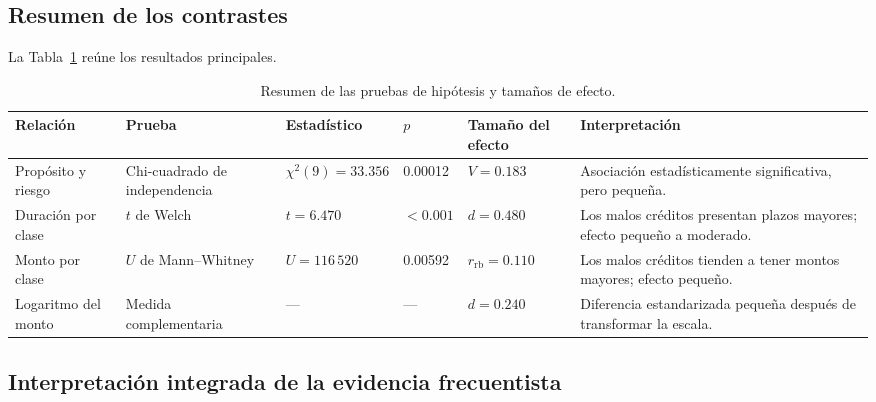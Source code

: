 \subsection{Resumen de los contrastes}

La Tabla~\ref{tab:resumen-inferencia} reúne los resultados principales.

\begin{table}[H]
    \centering
    \caption{Resumen de las pruebas de hipótesis y tamaños de efecto.}
    \label{tab:resumen-inferencia}

    \footnotesize
    \begin{tabularx}{\textwidth}{
        @{}
        >{\raggedright\arraybackslash}p{2.5cm}
        >{\raggedright\arraybackslash}p{2.7cm}
        >{\centering\arraybackslash}p{2.3cm}
        >{\centering\arraybackslash}p{1.5cm}
        >{\raggedright\arraybackslash}p{2.7cm}
        X
        @{}
    }
        \toprule
        Relación
        & Prueba
        & Estadístico
        & \(p\)
        & Tamaño del efecto
        & Interpretación \\
        \midrule

        Propósito y riesgo
        & Chi-cuadrado de independencia
        & \(\chi^2(9)=33.356\)
        & \num{0.00012}
        & \(V=0.183\)
        & Asociación estadísticamente significativa, pero pequeña. \\

        Duración por clase
        & \(t\) de Welch
        & \(t=6.470\)
        & \(<0.001\)
        & \(d=0.480\)
        & Los malos créditos presentan plazos mayores; efecto pequeño a
          moderado. \\

        Monto por clase
        & \(U\) de Mann--Whitney
        & \(U=116\,520\)
        & \num{0.00592}
        & \(r_{\mathrm{rb}}=0.110\)
        & Los malos créditos tienden a tener montos mayores; efecto
          pequeño. \\

        Logaritmo del monto
        & Medida complementaria
        & ---
        & ---
        & \(d=0.240\)
        & Diferencia estandarizada pequeña después de transformar la
          escala. \\

        \bottomrule
    \end{tabularx}
\end{table}

\subsection{Interpretación integrada de la evidencia frecuentista}

